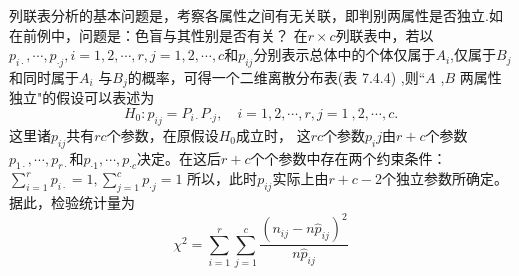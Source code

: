列联表分析的基本问题是，考察各属性之间有无关联，即判别两属性是否独立.如在前例中，问题是：色盲与其性别是否有关？ 在$r \times c$列联表中，若以$p_{i\cdot},\cdots,p_{\cdot j},i=1,2,\cdots,r,j=1,2,\cdots,c$和$p_{ij}$分别表示总体中的个体仅属于$A_{i}$,仅属于$B_{j}$和同时属于$A_i$ 与$B_j$的概率，可得一个二维离散分布表(表 7.4.4) ,则“$A$ ,$B$ 两属性独立"的假设可以表述为
$$
    H_{0}:p_{ij}=P_{i \cdot} P_{\cdot j},\quad i=1,2,\cdots,r,j=1\:,2,\cdots,c.
$$
这里诸$p_{ij}$共有$rc$个参数，在原假设$H_0$成立时， 这$rc$个参数$p_ij$由$r+c$个参数$p_{1\cdot},\cdots,p_{r\cdot}$和$p_{\cdot 1},\cdots,p_{\cdot c}$决定。在这后$r+c$个个参数中存在两个约束条件：$\sum_{i=1}^{r} p_{i \cdot }=1,\sum_{j=1}^{c} p_{\cdot j}=1$
所以，此时$p_{ij}$实际上由$r + c-2$个独立参数所确定。据此，检验统计量为
$$
    \chi^{2}=\sum_{i=1}^{r}\sum_{j=1}^{c}\frac{(n_{ij}-n\hat{p}_{ij})^{2}}{n\hat{p}_{ij}}
$$

